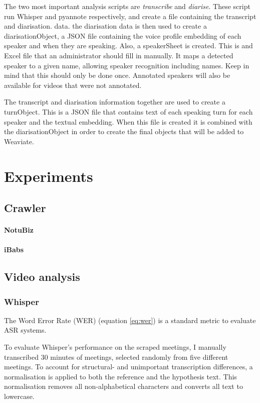 \documentclass[twoside]{uva-inf-bachelor-thesis}
\begin{document}
The two most important analysis scripts are \textit{transcribe} and \textit{diarise}. These script run Whisper and pyannote respectively, and create a file containing the transcript and diarisation. data. the diarisation data is then used to create a diarisationObject, a JSON file containing the voice profile embedding of each speaker and when they are speaking. Also, a speakerSheet is created. This is and Excel file that an administrator should fill in manually. It maps a detected speaker to a given name, allowing speaker recognition including names. Keep in mind that this should only be done once. Annotated speakers will also be available for videos that were not annotated.

The transcript and diarisation information together are used to create a turnObject. This is a JSON file that contains text of each speaking turn for each speaker and the textual embedding. When this file is created it is combined with the diarisationObject in order to create the final objects that will be added to Weaviate.


\chapter{Experiments}
\section{Crawler}
\subsubsection{NotuBiz}

\subsubsection{iBabs}


\section{Video analysis}
\subsection{Whisper}
The Word Error Rate (WER) (equation \ref{eq:wer}) is a standard metric to evaluate ASR systems. 

To evaluate Whisper's performance on the scraped meetings, I manually transcribed 30 minutes of meetings, selected randomly from five different meetings. To account for structural- and unimportant transcription differences, a normalisation is applied to both the reference and the hypothesis text. 
This normalisation removes all non-alphabetical characters and converts all text to lowercase. 
\end{document}
